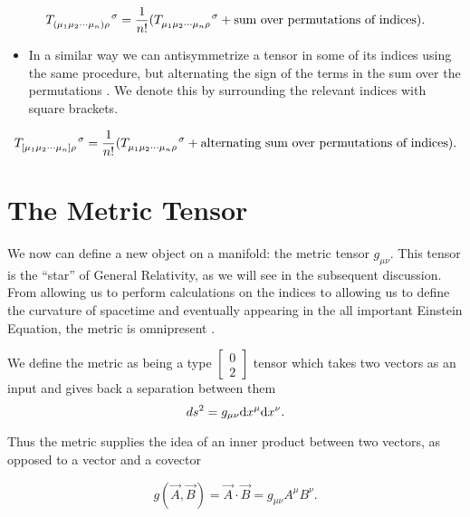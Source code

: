 \begin{equation} \label{tensor-symmetrize}
	T\indices{_{(\mu_1 \mu_2 \cdots \mu_n)}_\rho^\sigma} = \frac{1}{n!} (T \indices{_{\mu_1}_{\mu_2}_{\cdots}_{\mu_n}_\rho^\sigma }
	+ \text{sum over permutations of indices}).
\end{equation}
\begin{itemize}
	\item In a similar way we can antisymmetrize a tensor in some of its indices using the same procedure, but alternating the sign of the terms in the sum over the permutations \cite{carroll}. We denote this by surrounding the relevant indices with square brackets.
\end{itemize}
\begin{equation} \label{tensor-antisymmetrize}
	T\indices{_{[\mu_1 \mu_2 \cdots \mu_n]}_\rho^\sigma} = \frac{1}{n!} (T \indices{_{\mu_1}_{\mu_2}_{\cdots}_{\mu_n}_\rho^\sigma }
+ \text{alternating sum over permutations of indices}) .
\end{equation}
\section{The Metric Tensor}

We now can define a new object on a manifold: the metric tensor \(g_{\mu \nu}\). This tensor is the ``star'' of General Relativity, as we will see in the subsequent discussion. From allowing us to perform calculations on the indices to allowing us to define the curvature of spacetime and eventually appearing in the all important Einstein Equation, the metric is omnipresent \cite{carroll, szekeres, cheng}.

We define the metric as being a type \( \left[ \begin{smallmatrix} 0 \\ 2 \end{smallmatrix} \right] \) tensor which takes two vectors as an input and gives back a separation between them
\begin{equation} \label{line-el}
	ds^2 = g_{\mu \nu} \text{d}x^{\mu} \text{d}x^{\nu} .
\end{equation}

Thus the metric supplies the idea of an inner product between two vectors, as opposed to a vector and a covector \cite{hartle}

\begin{equation} \label{inner-metric}
	g(\vec{A}, \vec{B}) = \vec{A} \cdot \vec{B} = g_{\mu \nu} A^{\mu} B^{\nu} .
\end{equation} 

